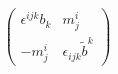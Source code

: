 \begin{equation}
  \left(
    \begin{array}{cc}
      \epsilon^{ijk}b_k & m^i_j \\
      -m_{j}^{i} & \epsilon_{ijk} \tilde{b}^{{k}}
    \end{array} \right)
\end{equation}

